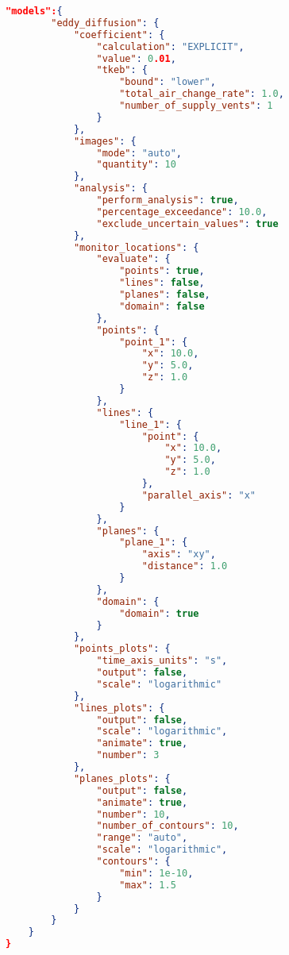 \begin{lstlisting}[language=json,firstnumber=1]
    "models":{
        "eddy_diffusion": {
            "coefficient": {
                "calculation": "EXPLICIT",
                "value": 0.01,
                "tkeb": {
                    "bound": "lower",
                    "total_air_change_rate": 1.0,
                    "number_of_supply_vents": 1
                }
            },
            "images": {
                "mode": "auto",
                "quantity": 10
            },
            "analysis": {
                "perform_analysis": true,
                "percentage_exceedance": 10.0,
                "exclude_uncertain_values": true 
            },
            "monitor_locations": {
                "evaluate": {
                    "points": true,
                    "lines": false,
                    "planes": false,
                    "domain": false
                },
                "points": {
                    "point_1": {
                        "x": 10.0,
                        "y": 5.0,
                        "z": 1.0
                    }
                },
                "lines": {
                    "line_1": {
                        "point": {
                            "x": 10.0,
                            "y": 5.0,
                            "z": 1.0 
                        },
                        "parallel_axis": "x"
                    }
                },
                "planes": {
                    "plane_1": {
                        "axis": "xy",
                        "distance": 1.0
                    }
                },
                "domain": {
                    "domain": true 
                }
            },
            "points_plots": {
                "time_axis_units": "s",
                "output": false,
                "scale": "logarithmic"
            },
            "lines_plots": {
                "output": false,
                "scale": "logarithmic",
                "animate": true,
                "number": 3 
            },
            "planes_plots": {
                "output": false,
                "animate": true,
                "number": 10,
                "number_of_contours": 10,
                "range": "auto",
                "scale": "logarithmic",
                "contours": {
                    "min": 1e-10,
                    "max": 1.5
                }
            }
        }
    }
}
\end{lstlisting}

